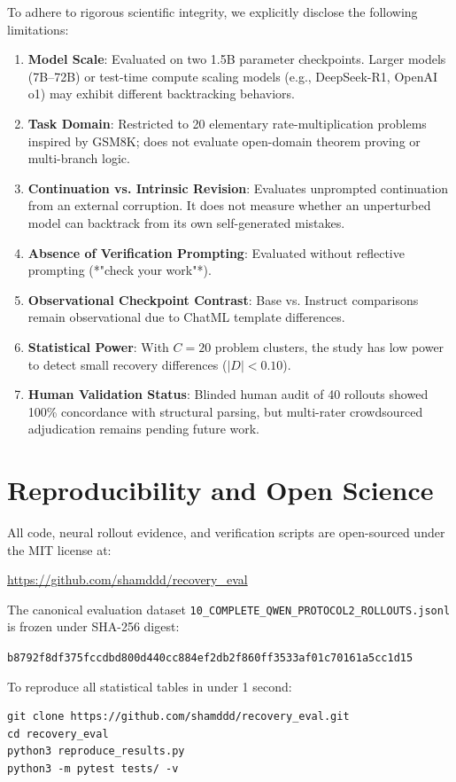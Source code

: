 \documentclass[11pt,letterpaper]{article}
\begin{document}
To adhere to rigorous scientific integrity, we explicitly disclose the following limitations:
\begin{enumerate}[leftmargin=*]
    \item \textbf{Model Scale}: Evaluated on two 1.5B parameter checkpoints. Larger models (7B--72B) or test-time compute scaling models (e.g., DeepSeek-R1, OpenAI o1) may exhibit different backtracking behaviors.
    \item \textbf{Task Domain}: Restricted to 20 elementary rate-multiplication problems inspired by GSM8K; does not evaluate open-domain theorem proving or multi-branch logic.
    \item \textbf{Continuation vs. Intrinsic Revision}: Evaluates unprompted continuation from an external corruption. It does not measure whether an unperturbed model can backtrack from its own self-generated mistakes.
    \item \textbf{Absence of Verification Prompting}: Evaluated without reflective prompting (*"check your work"*).
    \item \textbf{Observational Checkpoint Contrast}: Base vs. Instruct comparisons remain observational due to ChatML template differences.
    \item \textbf{Statistical Power}: With $C=20$ problem clusters, the study has low power to detect small recovery differences ($|D| < 0.10$).
    \item \textbf{Human Validation Status}: Blinded human audit of 40 rollouts showed 100\% concordance with structural parsing, but multi-rater crowdsourced adjudication remains pending future work.
\end{enumerate}

\section{Reproducibility and Open Science}

All code, neural rollout evidence, and verification scripts are open-sourced under the MIT license at:
\begin{center}
\url{https://github.com/shamddd/recovery_eval}
\end{center}
The canonical evaluation dataset \texttt{10\_COMPLETE\_QWEN\_PROTOCOL2\_ROLLOUTS.jsonl} is frozen under SHA-256 digest:
\begin{center}
\texttt{b8792f8df375fccdbd800d440cc884ef2db2f860ff3533af01c70161a5cc1d15}
\end{center}
To reproduce all statistical tables in under 1 second:
\begin{verbatim}
git clone https://github.com/shamddd/recovery_eval.git
cd recovery_eval
python3 reproduce_results.py
python3 -m pytest tests/ -v
\end{verbatim}
\end{document}
